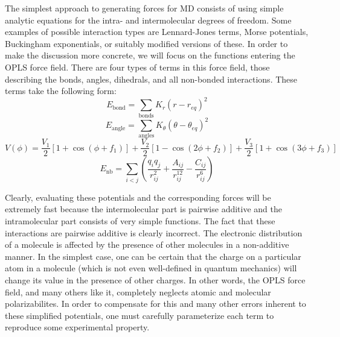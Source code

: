 \documentclass[11pt, proquest]{uwthesis}[2020/02/24]
\begin{document}
The simplest approach to generating forces for MD consists of using simple analytic equations for the intra- and intermolecular degrees of freedom. Some examples of possible interaction types are Lennard-Jones terms\autocite{jones_determination_1924,jones_determination_1924-1}, Morse potentials\autocite{morse_diatomic_1929}, Buckingham exponentials\autocite{buckingham_classical_1938}, or suitably modified versions of these\autocite{werhahn_new_2015}. In order to make the discussion more concrete, we will focus on the functions entering the OPLS force field\autocite{damm_opls_1997}. There are four types of terms in this force field, those describing the bonds, angles, dihedrals, and all non-bonded interactions. These terms take the following form:
\begin{equation}
    E_{\mathrm{bond}}=\sum_{\mathrm{bonds}}K_r(r-r_{eq})^2
\end{equation}
\begin{equation}
    E_{\mathrm{angle}}=\sum_{\mathrm{angles}}K_\theta(\theta-\theta_{eq})^2
\end{equation}
\begin{equation}
    V(\phi)=\frac{V_1}{2}[1+\cos(\phi+f_1)] + \frac{V_2}{2}[1-\cos(2\phi+f_2)] + \frac{V_3}{2}[1+\cos(3\phi+f_3)]
\end{equation}
\begin{equation}
    E_{\mathrm{nb}}=\sum_{i<j}\left(\frac{q_iq_j}{r_{ij}^2}+\frac{A_{ij}}{r_{ij}^{12}}-\frac{C_{ij}}{r_{ij}^6}\right)
\end{equation}

\par Clearly, evaluating these potentials and the corresponding forces will be extremely fast because the intermolecular part is pairwise additive and the intramolecular part consists of very simple functions. The fact that these interactions are pairwise additive is clearly incorrect. The electronic distribution of a molecule is affected by the presence of other molecules in a non-additive manner\autocite{stone_theory_2013}. In the simplest case, one can be certain that the charge on a particular atom in a molecule (which is not even well-defined in quantum mechanics) will change its value in the presence of other charges. In other words, the OPLS force field, and many others like it, completely neglects atomic and molecular polarizabilites. In order to compensate for this and many other errors inherent to these simplified potentials, one must carefully parameterize each term to reproduce some experimental property.
\end{document}
